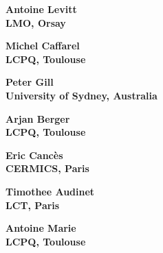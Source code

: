 \documentclass[20pt]{beamer}
\begin{document}
\begin{frame}
	\begin{center}
		\huge \bf Antoine Levitt
		\\
		\vspace{20mm}
		\large LMO, Orsay
	\end{center}
\end{frame}

\begin{frame}
	\begin{center}
		\huge \bf Michel Caffarel
		\\
		\vspace{20mm}
		\large LCPQ, Toulouse
	\end{center}
\end{frame}

\begin{frame}
	\begin{center}
		\huge \bf Peter Gill
		\\
		\vspace{20mm}
		\large University of Sydney, Australia
	\end{center}
\end{frame}

\begin{frame}
	\begin{center}
		\huge \bf Arjan Berger
		\\
		\vspace{20mm}
		\large LCPQ, Toulouse
	\end{center}
\end{frame}

\begin{frame}
	\begin{center}
		\huge \bf Eric Cancès
		\\
		\vspace{20mm}
		\large CERMICS, Paris
	\end{center}
\end{frame}

\begin{frame}
	\begin{center}
		\huge \bf Timothee Audinet
		\\
		\vspace{20mm}
		\large LCT, Paris
	\end{center}
\end{frame}

\begin{frame}
	\begin{center}
		\huge \bf Antoine Marie
		\\
		\vspace{20mm}
		\large LCPQ, Toulouse
	\end{center}
\end{frame}
\end{document}
